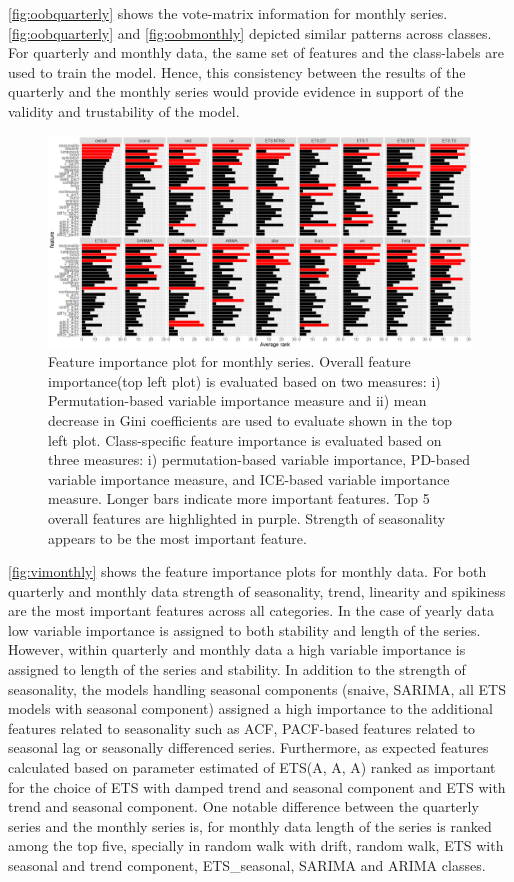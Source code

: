 \documentclass[11pt,a4paper,]{article}
\begin{document}
\autoref{fig:oobquarterly} shows the vote-matrix information for monthly
series. \autoref{fig:oobquarterly} and \autoref{fig:oobmonthly} depicted
similar patterns across classes. For quarterly and monthly data, the
same set of features and the class-labels are used to train the model.
Hence, this consistency between the results of the quarterly and the
monthly series would provide evidence in support of the validity and
trustability of the model.

\begin{figure}
\centering
\includegraphics{figures/vimonthly-1.png}
\caption{\label{fig:vimonthly}Feature importance plot for monthly series.
Overall feature importance(top left plot) is evaluated based on two
measures: i) Permutation-based variable importance measure and ii) mean
decrease in Gini coefficients are used to evaluate shown in the top left
plot. Class-specific feature importance is evaluated based on three
measures: i) permutation-based variable importance, PD-based variable
importance measure, and ICE-based variable importance measure. Longer
bars indicate more important features. Top 5 overall features are
highlighted in purple. Strength of seasonality appears to be the most
important feature.}
\end{figure}

\autoref{fig:vimonthly} shows the feature importance plots for monthly
data. For both quarterly and monthly data strength of seasonality,
trend, linearity and spikiness are the most important features across
all categories. In the case of yearly data low variable importance is
assigned to both stability and length of the series. However, within
quarterly and monthly data a high variable importance is assigned to
length of the series and stability. In addition to the strength of
seasonality, the models handling seasonal components (snaive, SARIMA,
all ETS models with seasonal component) assigned a high importance to
the additional features related to seasonality such as ACF, PACF-based
features related to seasonal lag or seasonally differenced series.
Furthermore, as expected features calculated based on parameter
estimated of ETS(A, A, A) ranked as important for the choice of ETS with
damped trend and seasonal component and ETS with trend and seasonal
component. One notable difference between the quarterly series and the
monthly series is, for monthly data length of the series is ranked among
the top five, specially in random walk with drift, random walk, ETS with
seasonal and trend component, ETS\_seasonal, SARIMA and ARIMA classes.
\end{document}
